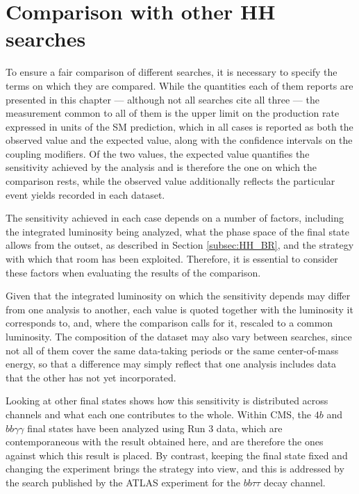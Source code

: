 \section{Comparison with other HH searches}
\label{sec:bbtt_comparison}
%
To ensure a fair comparison of different searches, it is necessary to specify the terms on which they are compared. While the quantities each of them reports are presented in this chapter — although not all searches cite all three — the measurement common to all of them is the upper limit on the production rate expressed in units of the SM prediction, which in all cases is reported as both the observed value and the expected value, along with the confidence intervals on the coupling modifiers. Of the two values, the expected value quantifies the sensitivity achieved by the analysis and is therefore the one on which the comparison rests, while the observed value additionally reflects the particular event yields recorded in each dataset. 

The sensitivity achieved in each case depends on a number of factors, including the integrated luminosity being analyzed, what the phase space of the final state allows from the outset, as described in Section \ref{subsec:HH_BR}, and the strategy with which that room has been exploited. Therefore, it is essential to consider these factors when evaluating the results of the comparison.

Given that the integrated luminosity on which the sensitivity depends may differ from one analysis to another, each value is quoted together with the luminosity it corresponds to, and, where the comparison calls for it, rescaled to a common luminosity. The composition of the dataset may also vary between searches, since not all of them cover the same data-taking periods or the same center-of-mass energy, so that a difference may simply reflect that one analysis includes data that the other has not yet incorporated.

Looking at other final states shows how this sensitivity is distributed across channels and what each one contributes to the whole. Within CMS, the $4b$ and $bb\gamma\gamma$ final states have been analyzed using Run 3 data, which are contemporaneous with the result obtained here, and are therefore the ones against which this result is placed. By contrast, keeping the final state fixed and changing the experiment brings the strategy into view, and this is addressed by the search published by the ATLAS experiment for the $bb\tau\tau$ decay channel.

